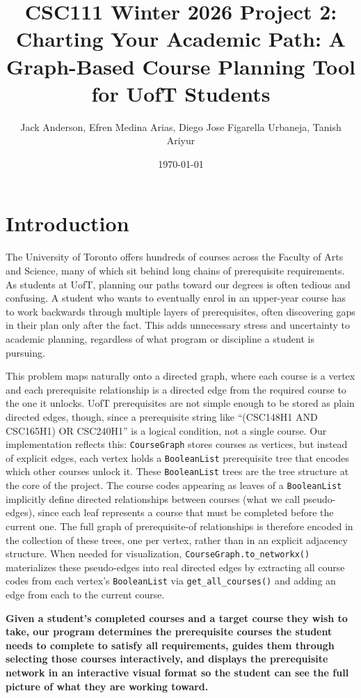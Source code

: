 \documentclass[11pt]{article}
\title{CSC111 Winter 2026 Project 2:\\Charting Your Academic Path:
A Graph-Based Course Planning Tool for UofT Students}
\author{Jack Anderson, Efren Medina Arias, Diego Jose Figarella Urbaneja, Tanish Ariyur}
\date{\today}
\begin{document}
\maketitle

\section*{Introduction}

The University of Toronto offers hundreds of courses across the Faculty of Arts and Science,
many of which sit behind long chains of prerequisite requirements. As students at UofT,
planning our paths toward our degrees is often tedious and confusing. A student who wants to
eventually enrol in an upper-year course has to work backwards through multiple layers of
prerequisites, often discovering gaps in their plan only after the fact. This adds unnecessary
stress and uncertainty to academic planning, regardless of what program or discipline a student
is pursuing.

This problem maps naturally onto a directed graph, where each course is a vertex and each
prerequisite relationship is a directed edge from the required course to the one it unlocks.
UofT prerequisites are not simple enough to be stored as plain directed edges, though, since
a prerequisite string like ``(CSC148H1 AND CSC165H1) OR CSC240H1'' is a logical condition,
not a single course. Our implementation reflects this: \verb|CourseGraph| stores courses as
vertices, but instead of explicit edges, each vertex holds a \verb|BooleanList| prerequisite
tree that encodes which other courses unlock it. These \verb|BooleanList| trees are the tree
structure at the core of the project. The course codes appearing as leaves of a
\verb|BooleanList| implicitly define directed relationships between courses (what we call
pseudo-edges), since each leaf represents a course that must be completed before the current
one. The full graph of prerequisite-of relationships is therefore encoded in the collection of
these trees, one per vertex, rather than in an explicit adjacency structure. When needed for
visualization, \verb|CourseGraph.to_networkx()| materializes these pseudo-edges into real
directed edges by extracting all course codes from each vertex's \verb|BooleanList| via
\verb|get_all_courses()| and adding an edge from each to the current course.

\textbf{Given a student's completed courses and a target course they wish to take, our
program determines the prerequisite courses the student needs to complete to satisfy all
requirements, guides them through selecting those courses interactively, and displays the
prerequisite network in an interactive visual format so the student can see the full picture
of what they are working toward.}
\end{document}
